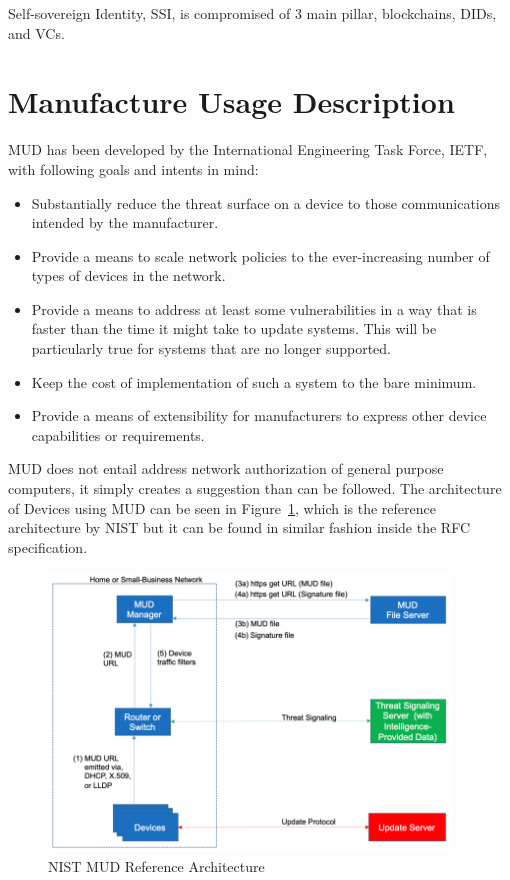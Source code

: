 Self-sovereign Identity, SSI, is compromised of 3 main pillar, blockchains, DIDs, and VCs.



\section{Manufacture Usage Description} %
\label{sec:Manufacture Usage Description}

MUD has been developed by the International Engineering Task Force, IETF, with following goals and intents in mind:
\cite{rfc8520-mud}
\begin{itemize}
	\item Substantially reduce the threat surface on a device to those communications intended by the manufacturer.
	\item Provide a means to scale network policies to the ever-increasing number of types of devices in the network.
	\item Provide a means to address at least some vulnerabilities in a way that is faster than the time it might
	      take to update systems. This will be particularly true for systems that are no longer supported.
	\item Keep the cost of implementation of such a system to the bare minimum.
	\item Provide a means of extensibility for manufacturers to express other device capabilities or requirements.
\end{itemize}

MUD does not entail address network authorization of general purpose computers, it simply creates a suggestion than can
be followed.
The architecture of Devices using MUD can be seen in Figure~\ref{fig:NIST MUD Reference Architecture}, which is the
reference architecture by NIST \cite{dodson2021securing} but it can be found in similar fashion inside the RFC
specification.

\begin{figure}
	\begin{center}
		\includegraphics[width=0.95\textwidth]{figures/nist-mud-arch.png}
	\end{center}
	\caption{NIST MUD Reference Architecture}
	\label{fig:NIST MUD Reference Architecture}
\end{figure}

